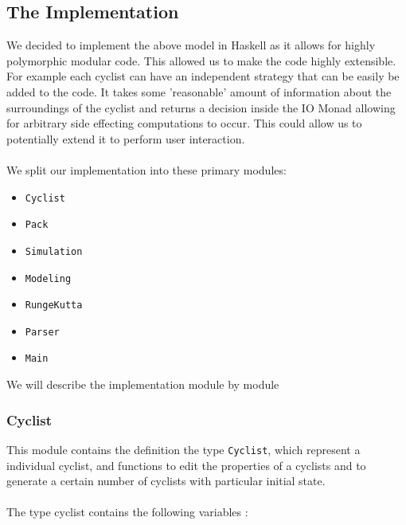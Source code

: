 \documentclass[10pt, a4paper]{report}
\begin{document}
\subsection{The Implementation}\label{subsec:impl}

We decided to implement the above model in Haskell as it allows for highly polymorphic modular code. This allowed us to make the code highly extensible. For example each cyclist can have an independent strategy that can be easily be added to the code. It takes some 'reasonable' amount of information about the surroundings of the cyclist and returns a decision inside the IO Monad allowing for arbitrary side effecting computations to occur. This could allow us to potentially extend it to perform user interaction. \\\\
We split our implementation into these primary modules:
\begin{itemize}
\item \texttt{Cyclist}
\item \texttt{Pack}
\item \texttt{Simulation}
\item \texttt{Modeling}
\item \texttt{RungeKutta}
\item \texttt{Parser}
\item \texttt{Main}
\end{itemize}
We will describe the implementation module by module

\subsubsection{Cyclist}

This module contains the definition the type \texttt{Cyclist}, which represent a individual cyclist, and functions to edit the properties of a cyclists and to generate a certain number of cyclists with particular initial state. \\\\
The type cyclist contains the following variables :
\end{document}
